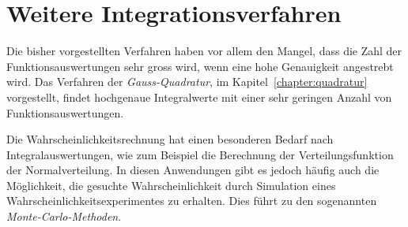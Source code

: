 %
%
%
\section{Weitere Integrationsverfahren
\label{buch:section:weitereintegrationsverfahren}}
Die bisher vorgestellten Verfahren haben vor allem den Mangel, dass
die Zahl der Funktionsauswertungen sehr gross wird, wenn eine
hohe Genauigkeit angestrebt wird.
Das Verfahren der {\em Gauss-Quadratur}, im Kapitel~\ref{chapter:quadratur}
%
vorgestellt, findet hochgenaue Integralwerte mit einer sehr geringen
Anzahl von Funktionsauswertungen.

Die Wahrscheinlichkeitsrechnung hat einen besonderen Bedarf nach
Integralauswertungen, wie zum Beispiel die Berechnung der 
Verteilungsfunktion der Normalverteilung.
In diesen Anwendungen gibt es jedoch häufig auch die Möglichkeit,
die gesuchte Wahrscheinlichkeit durch Simulation eines
Wahrscheinlichkeitsexperimentes zu erhalten.
Dies führt zu den sogenannten {\em Monte-Carlo-Methoden}.
%

